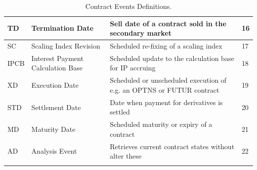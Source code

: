 \documentclass[9pt,oneside]{amsart}
\begin{document}
\begin{longtable}{| p{}p{}p{}p{} |}
	\hline
	TD & Termination Date & Sell date of a contract sold in the secondary market & 16 \\
	\hline
	SC & Scaling Index Revision & Scheduled re-fixing of a scaling index & 17 \\
	\hline
	IPCB & Interest Payment Calculation Base & Scheduled update to the calculation base for IP accruing & 18 \\
	\hline
	XD & Execution Date & Scheduled or unscheduled execution of e.g. an OPTNS or FUTUR contract & 19 \\
	\hline
	STD & Settlement Date & Date when payment for derivatives is settled & 20 \\
	\hline
	MD & Maturity Date & Scheduled maturity or expiry of a contract & 21 \\
	\hline	
	AD & Analysis Event & Retrieves current contract states without alter these & 22 \\
	\hline
	\caption{Contract Events Definitions.}
	\label{tbl:events}
\end{longtable}
\end{document}

